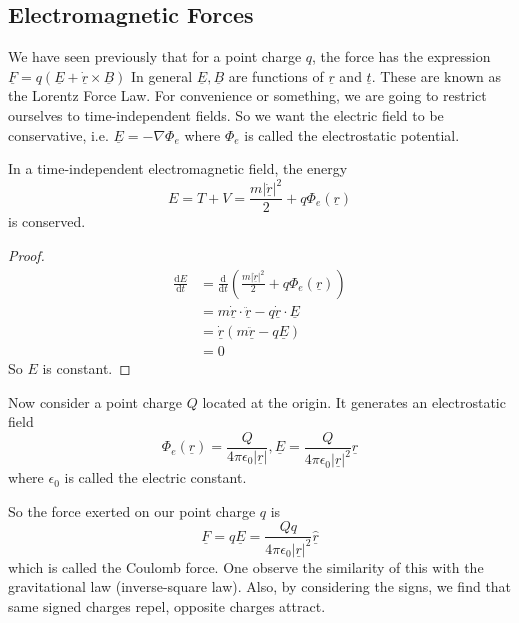 \subsection{Electromagnetic Forces}
We have seen previously that for a point charge $q$, the force has the expression $\underline{F}=q(\underline{E}+\underline{\dot{r}}\times\underline{B})$
In general $\underline{E},\underline{B}$ are functions of $\underline{r}$ and $\underline{t}$.
These are known as the Lorentz Force Law.
For convenience or something, we are going to restrict ourselves to time-independent fields.
So we want the electric field to be conservative, i.e. $\underline{E}=-\nabla\Phi_e$ where $\Phi_e$ is called the electrostatic potential.
\begin{claim}
    In a time-independent electromagnetic field, the energy
    $$E=T+V=\frac{m|\underline{\dot{r}}|^2}{2}+q\Phi_e(\underline{r})$$
    is conserved.
\end{claim}
\begin{proof}
    \begin{align*}
        \frac{\mathrm dE}{\mathrm dt}&=\frac{\mathrm d}{\mathrm dt}\left(\frac{m|\underline{\dot{r}}|^2}{2}+q\Phi_e(\underline{r})\right)\\
        &=m\underline{\dot{r}}\cdot\underline{\ddot{r}}-q\underline{\dot{r}}\cdot\underline{E}\\
        &=\underline{\dot{r}}(m\underline{\ddot{r}}-q\underline{E})\\
        &=0
    \end{align*}
    So $E$ is constant.
\end{proof}
\begin{law}
    Now consider a point charge $Q$ located at the origin.
    It generates an electrostatic field
    $$\Phi_e(\underline{r})=\frac{Q}{4\pi\epsilon_0|\underline{r}|},\underline{E}=\frac{Q}{4\pi\epsilon_0|\underline{r}|^2}\underline{\hat{r}}$$
    where $\epsilon_0$ is called the electric constant.
\end{law}
So the force exerted on our point charge $q$ is
$$\underline{F}=q\underline{E}=\frac{Qq}{4\pi\epsilon_0|\underline{r}|^2}\underline{\hat{r}}$$
which is called the Coulomb force.
One observe the similarity of this with the gravitational law (inverse-square law).
Also, by considering the signs, we find that same signed charges repel, opposite charges attract.
